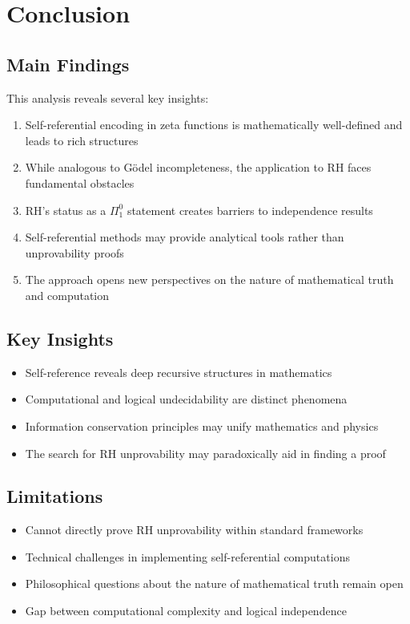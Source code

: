 \documentclass[12pt]{article}
\theoremstyle{plain}
\theoremstyle{definition}
\begin{document}
\section{Conclusion}

\subsection{Main Findings}

This analysis reveals several key insights:

\begin{enumerate}
\item Self-referential encoding in zeta functions is mathematically well-defined and leads to rich structures
\item While analogous to Gödel incompleteness, the application to RH faces fundamental obstacles
\item RH's status as a $\Pi_1^0$ statement creates barriers to independence results
\item Self-referential methods may provide analytical tools rather than unprovability proofs
\item The approach opens new perspectives on the nature of mathematical truth and computation
\end{enumerate}

\subsection{Key Insights}

\begin{itemize}
\item Self-reference reveals deep recursive structures in mathematics
\item Computational and logical undecidability are distinct phenomena
\item Information conservation principles may unify mathematics and physics
\item The search for RH unprovability may paradoxically aid in finding a proof
\end{itemize}

\subsection{Limitations}

\begin{itemize}
\item Cannot directly prove RH unprovability within standard frameworks
\item Technical challenges in implementing self-referential computations
\item Philosophical questions about the nature of mathematical truth remain open
\item Gap between computational complexity and logical independence
\end{itemize}
\end{document}
